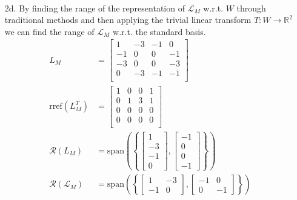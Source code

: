 \documentclass[12pt,fleqn,leqno,letterpaper]{article}
\begin{document}
\begin{enumerate}
\begin{align*}
					\end{align*}
		\item[2d.]
			By finding the range of the representation of $\mathcal{L}_{M}$ w.r.t. $W$ through traditional methods and then applying the trivial linear transform $T : W \rightarrow \mathbb{R}^{2}$ we can find the range of $\mathcal{L}_{M}$ w.r.t. the standard basis.
			\begin{align*}
			  L_{M} &= \begin{bmatrix}
				     1 &  -3  & -1 &  0\\
					-1 &   0  &  0 & -1\\
					-3 &   0  &  0 & -3\\
					 0  & -3  & -1 & -1\\
				      \end{bmatrix}\\
			  \text{rref}(L_{M}^{T}) &= \begin{bmatrix}
									1  &  0  &  0  &  1\\
									0  &  1  &  3  &  1\\
									0  &  0  &  0  &  0\\
									0  &  0  &  0  &  0\\
	 							  \end{bmatrix}\\
			  \mathcal{R}(L_{M}) &= \text{span}\left(\left\{
			  	\begin{bmatrix} 1 \\ -3 \\ -1 \\ 0 \end{bmatrix}, \begin{bmatrix} -1 \\ 0 \\ 0 \\ -1 \end{bmatrix}
			  \right\}\right)\\
			  \mathcal{R}(\mathcal{L}_{M}) &= \text{span}\left(\left\{
			  	\begin{bmatrix} 1 & -3 \\ -1 & 0 \end{bmatrix}, \begin{bmatrix} -1 & 0 \\ 0 & -1 \end{bmatrix}
			  \right\}\right)\\
			\end{align*}

		\end{enumerate}
\end{document}
